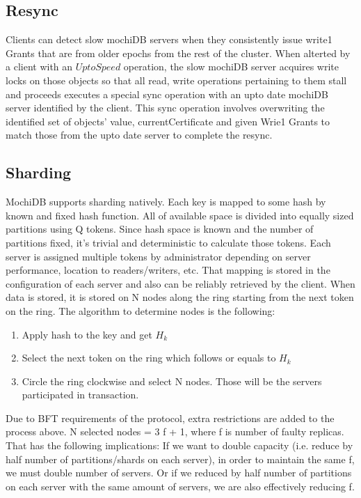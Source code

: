 \documentclass[letterpaper,twocolumn,10pt]{article}
\begin{document}
\subsection{Resync}
Clients can detect slow mochiDB servers when they consistently issue write1 Grants that are from older epochs from the rest of the cluster. When alterted by a client with an $UptoSpeed$ operation, the slow mochiDB server acquires write locks on those objects so that all read, write operations pertaining to them stall and proceeds executes a special sync operation with an upto date mochiDB server identified by the client. This sync operation involves overwriting the identified set of objects' value, currentCertificate and given Wrie1 Grants to match those from the upto date server to complete the resync.

\subsection{Sharding}
MochiDB supports sharding natively. Each key is mapped to some hash by known and fixed hash function. All of available space is divided into equally sized partitions using Q tokens. Since hash space is known and the number of partitions fixed, it’s trivial and deterministic to calculate those tokens.
Each server is assigned multiple tokens by administrator depending on server performance, location to readers/writers, etc. That mapping is stored in the configuration of each server and also can be reliably retrieved by the client. When data is stored, it is stored on N nodes along the ring starting from the next token on the ring. The algorithm to determine nodes is the following:
\begin{enumerate}[noitemsep, topsep=0pt,]
  \item Apply hash to the key and get $H_{k}$
  \item Select the next token on the ring which follows or equals to $H_{k}$
  \item Circle the ring clockwise and select N nodes. Those will be the servers participated in transaction.
\end{enumerate}

Due to BFT requirements of the protocol, extra restrictions are added to the process above. N selected nodes = 3 f + 1, where f is number of faulty replicas. That has the following implications: If we want to double capacity (i.e. reduce by half number of partitions/shards on each server), in order to maintain the same f, we must double number of servers. Or if we reduced by half number of partitions on each server with the same amount of servers, we are also effectively reducing f.
\end{document}
